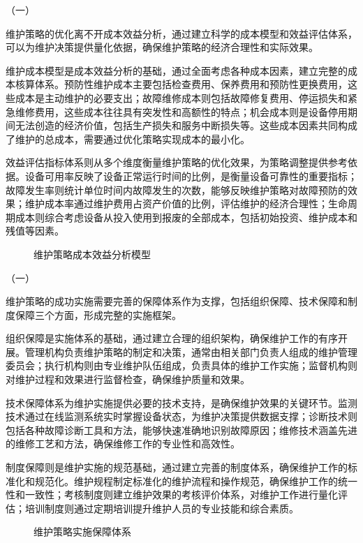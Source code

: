 （一）

维护策略的优化离不开成本效益分析，通过建立科学的成本模型和效益评估体系，可以为维护决策提供量化依据，确保维护策略的经济合理性和实际效果。

维护成本模型是成本效益分析的基础，通过全面考虑各种成本因素，建立完整的成本核算体系。预防性维护成本主要包括检查费用、保养费用和预防性更换费用，这些成本是主动维护的必要支出；故障维修成本则包括故障修复费用、停运损失和紧急维修费用，这些成本往往具有突发性和高额性的特点；机会成本则是设备停用期间无法创造的经济价值，包括生产损失和服务中断损失等。这些成本因素共同构成了维护的总成本，需要通过优化策略实现成本的最小化。

效益评估指标体系则从多个维度衡量维护策略的优化效果，为策略调整提供参考依据。设备可用率反映了设备正常运行时间的比例，是衡量设备可靠性的重要指标；故障发生率则统计单位时间内故障发生的次数，能够反映维护策略对故障预防的效果；维护成本率通过维护费用占资产价值的比例，评估维护的经济合理性；生命周期成本则综合考虑设备从投入使用到报废的全部成本，包括初始投资、维护成本和残值等因素。

\begin{figure}[h]
\centering
\caption{维护策略成本效益分析模型}
\label{fig:cost_benefit_analysis}
\end{figure}

（一）

维护策略的成功实施需要完善的保障体系作为支撑，包括组织保障、技术保障和制度保障三个方面，形成完整的实施框架。

组织保障是实施体系的基础，通过建立合理的组织架构，确保维护工作的有序开展。管理机构负责维护策略的制定和决策，通常由相关部门负责人组成的维护管理委员会；执行机构则由专业维护队伍组成，负责具体的维护工作实施；监督机构则对维护过程和效果进行监督检查，确保维护质量和效果。

技术保障体系为维护实施提供必要的技术支持，是确保维护效果的关键环节。监测技术通过在线监测系统实时掌握设备状态，为维护决策提供数据支撑；诊断技术则包括各种故障诊断工具和方法，能够快速准确地识别故障原因；维修技术涵盖先进的维修工艺和方法，确保维修工作的专业性和高效性。

制度保障则是维护实施的规范基础，通过建立完善的制度体系，确保维护工作的标准化和规范化。维护规程制定标准化的维护流程和操作规范，确保维护工作的统一性和一致性；考核制度则建立维护效果的考核评价体系，对维护工作进行量化评估；培训制度则通过定期培训提升维护人员的专业技能和综合素质。

\begin{figure}[h]
\centering
\caption{维护策略实施保障体系}
\label{fig:implementation_guarantee_system}
\end{figure}